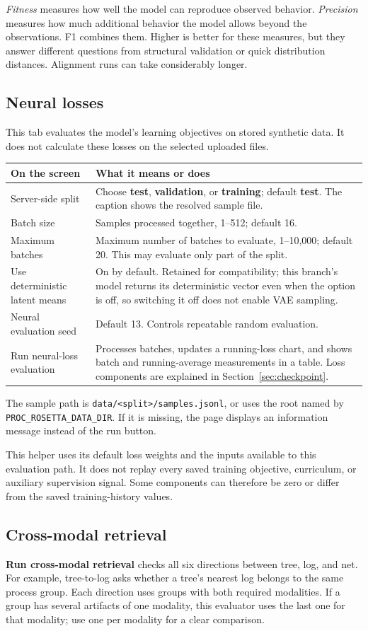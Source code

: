 \documentclass[11pt,a4paper]{article}
\makeatletter
\newcommand{\ui}[1]{\textbf{#1}}
\newcommand{\code}[1]{\nolinkurl{#1}}
\newenvironment{controls}{%
  \small\begin{longtable}{@{}>{\raggedright\arraybackslash}p{.34\linewidth}
    >{\raggedright\arraybackslash}p{.62\linewidth}@{}}
  \toprule\textbf{On the screen} & \textbf{What it means or does}\\\midrule\endhead
  \bottomrule\endfoot
}{\end{longtable}\normalsize}
\makeatother
\begin{document}
\emph{Fitness} measures how well the model can reproduce observed behavior.
\emph{Precision} measures how much additional behavior the model allows beyond
the observations. F1 combines them. Higher is better for these measures, but
they answer different questions from structural validation or quick
distribution distances. Alignment runs can take considerably longer.

\subsection{Neural losses}
This tab evaluates the model's learning objectives on stored synthetic data.
It does not calculate these losses on the selected uploaded files.
\begin{controls}
Server-side split & Choose \ui{test}, \ui{validation}, or \ui{training};
default \ui{test}. The caption shows the resolved sample file.\\
Batch size & Samples processed together, 1--512; default 16.\\
Maximum batches & Maximum number of batches to evaluate, 1--10,000;
default 20. This may evaluate only part of the split.\\
Use deterministic latent means & On by default. Retained for compatibility;
this branch's model returns its deterministic vector even when the option is
off, so switching it off does not enable VAE sampling.\\
Neural evaluation seed & Default 13. Controls repeatable random evaluation.\\
Run neural-loss evaluation & Processes batches, updates a running-loss chart,
and shows batch and running-average measurements in a table. Loss components
are explained in Section~\ref{sec:checkpoint}.\\
\end{controls}

The sample path is \code{data/<split>/samples.jsonl}, or uses the root named
by \code{PROC_ROSETTA_DATA_DIR}. If it is missing, the page displays an
information message instead of the run button.

This helper uses its default loss weights and the inputs available to this
evaluation path. It does not replay every saved training objective, curriculum,
or auxiliary supervision signal. Some components can therefore be zero or
differ from the saved training-history values.

\subsection{Cross-modal retrieval}
\ui{Run cross-modal retrieval} checks all six directions between tree, log,
and net. For example, tree-to-log asks whether a tree's nearest log belongs to
the same process group. Each direction uses groups with both required
modalities. If a group has several artifacts of one modality, this evaluator
uses the last one for that modality; use one per modality for a clear comparison.
\end{document}
